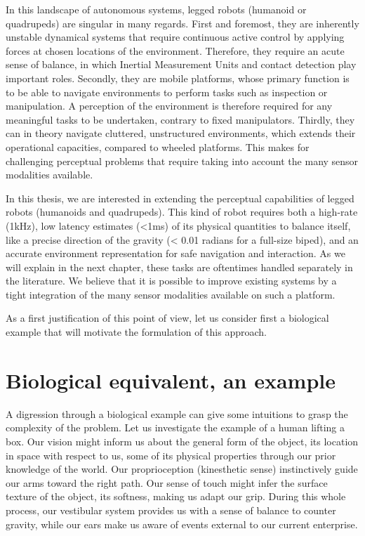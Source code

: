 
In this landscape of autonomous systems, legged robots (humanoid or quadrupeds) are singular in many regards. 
First and foremost, they are inherently unstable dynamical systems that require continuous active control by applying forces at chosen locations of the environment. 
Therefore, they require an acute sense of balance, in which Inertial Measurement Units and contact detection play important roles. 
Secondly, they are mobile platforms, whose primary function is to be able to navigate environments to perform tasks such as inspection or manipulation.
A perception of the environment is therefore required for any meaningful tasks to be undertaken, contrary to fixed manipulators.
Thirdly, they can in theory navigate cluttered, unstructured environments, which extends their operational capacities, compared to wheeled platforms.
This makes for challenging perceptual problems that require taking into account the many sensor modalities available.

In this thesis, we are interested in extending the perceptual capabilities of legged robots (humanoids and quadrupeds). This kind of robot requires both a high-rate (1kHz),
low latency estimates (<1ms) of its physical quantities to balance itself, like a precise direction of the gravity (< 0.01 radians for a full-size biped), 
and an accurate environment representation for safe navigation and interaction.
As we will explain in the next chapter, these tasks are oftentimes handled separately in the literature. We believe that it is possible to improve existing systems by a tight integration of the
many sensor modalities available on such a platform.

As a first justification of this point of view, let us consider first a biological example that will motivate the formulation of this approach.


\section{Biological equivalent, an example}

A digression through a biological example can give some intuitions to grasp the complexity of the problem. 
Let us investigate the example of a human lifting a box. Our vision might inform us about the general form of the object, 
its location in space with respect to us, some of its physical properties through our prior knowledge of the world. Our proprioception (kinesthetic sense) 
instinctively guide our arms toward the right path. Our sense of touch might infer the surface texture of the object,  its softness, making us 
adapt our grip. During this whole process, our vestibular system provides us with a sense of balance to counter gravity, while our ears 
make us aware of events external to our current enterprise.

